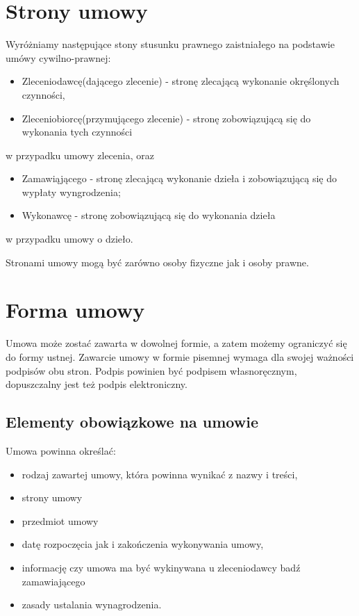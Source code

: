 \section[Strony umowy][Strony umowy]{Strony umowy}
Wyróżniamy następujące stony stusunku prawnego zaistniałego na podstawie umówy cywilno-prawnej:
\begin{itemize}
	\item Zleceniodawcę(dającego zlecenie) - stronę zlecającą wykonanie okręślonych czynności,
	\item Zleceniobiorcę(przymującego zlecenie) - stronę zobowiązującą się do wykonania tych czynności
\end{itemize}
w przypadku umowy zlecenia, oraz
\begin{itemize}
	\item Zamawiąjącego - stronę zlecającą wykonanie dzieła i zobowiązującą się do wypłaty wyngrodzenia;
	\item Wykonawcę - stronę zobowiązującą się do wykonania dzieła
\end{itemize}
w przypadku umowy o dzieło.

Stronami umowy mogą być zarówno osoby fizyczne jak i osoby prawne.

\section[Forma umowy][Forma umowy]{Forma umowy}
Umowa może zostać zawarta w dowolnej formie, a zatem możemy ograniczyć się do formy ustnej. Zawarcie umowy w formie pisemnej wymaga dla swojej ważności podpisów obu stron. Podpis powinien być podpisem własnoręcznym, dopuszczalny jest też podpis elektroniczny.

\subsection[Elementy obowiązkowe na umowie][Elementy obowiązkowe na umowie]{Elementy obowiązkowe na umowie}
Umowa powinna określać:
\begin{itemize}
\item rodzaj zawartej umowy, która powinna wynikać z nazwy i treści,
\item strony umowy
\item przedmiot umowy
\item datę rozpoczęcia jak i zakończenia wykonywania umowy,
\item informację czy umowa ma być wykinywana u zleceniodawcy badź zamawiającego
\item zasady ustalania wynagrodzenia.
\end{itemize}

